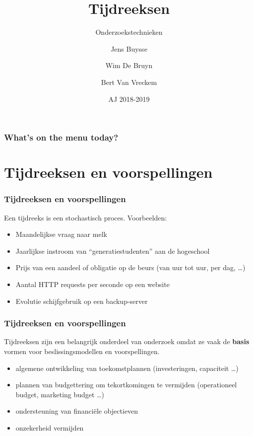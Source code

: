 \documentclass[aspectratio=169]{beamer}
\title[OZT: Tijdreeksen]{Tijdreeksen}
\subtitle{Onderzoekstechnieken}
\author{Jens Buysse \and Wim {De Bruyn} \and Bert {Van Vreckem}}
\date{AJ 2018-2019}
\begin{document}

\begin{frame}
\maketitle
\end{frame}

\begin{frame}
\frametitle{What's on the menu today?}

\tableofcontents
\end{frame}

\section{Tijdreeksen en voorspellingen}

\begin{frame}
  \frametitle{Tijdreeksen en voorspellingen}


  Een tijdreeks is een stochastisch proces. Voorbeelden:

  \begin{itemize}
    \item Maandelijkse vraag naar melk
    \item Jaarlijkse instroom van ``generatiestudenten'' aan de hogeschool
    \item Prijs van een aandeel of obligatie op de beurs (van uur tot uur, per dag, \dots)
    \item Aantal HTTP requests per seconde op een website
    \item Evolutie schijfgebruik op een backup-server
  \end{itemize}
\end{frame}

\begin{frame}
  \frametitle{Tijdreeksen en voorspellingen}

  Tijdreeksen zijn een belangrijk onderdeel van onderzoek omdat ze vaak de \textbf{basis} vormen voor beslissingsmodellen en voorspellingen.

  \begin{itemize}
    \item algemene ontwikkeling van toekomstplannen (investeringen, capaciteit \dots)
    \item plannen van budgettering om tekortkomingen te vermijden (operationeel budget, marketing budget \dots)
    \item ondersteuning van financi\"ele objectieven
    \item onzekerheid vermijden
  \end{itemize}
\end{frame}
\end{document}
